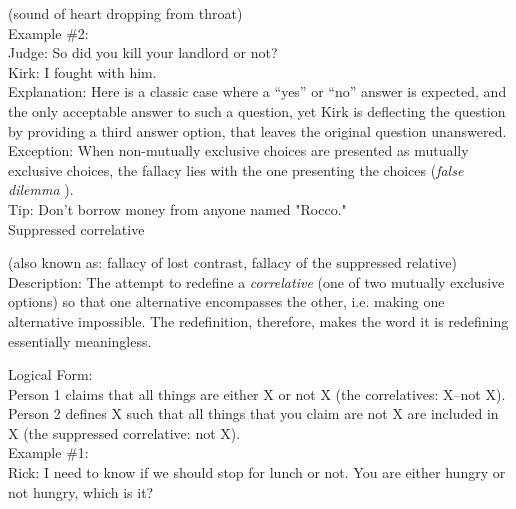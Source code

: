 \documentclass[a4paper,12pt,single,pdftex]{scrbook}
\begin{document}
    
      (sound of heart dropping from throat)
    \\

    
      Example \#2:
    \\

    
      Judge: So did you kill your landlord or not?
    \\

    
      Kirk: I fought with him.
    \\

    
      Explanation: Here is a classic case where a “yes” or “no” answer is expected, and the only acceptable answer to such a question, yet Kirk is deflecting the question by providing a third answer option, that leaves the original question unanswered.
    \\

    
      Exception: When non-mutually exclusive choices are presented as mutually exclusive choices, the fallacy lies with the one presenting the choices ({\it false dilemma} ).
    \\

    
      Tip: Don’t borrow money from anyone named "Rocco."
    \\

  

Suppressed correlative
    
      (also known as: fallacy of lost contrast, fallacy of the suppressed relative)
    \\

  
    Description: The attempt to redefine a {\it correlative} (one of two mutually exclusive options) so that one alternative encompasses the other, i.e. making one alternative impossible. The redefinition, therefore, makes the word it is redefining essentially meaningless.

    
      Logical Form:
    \\

    
      Person 1 claims that all things are either X or not X (the correlatives: X–not X).
    \\

    
      Person 2 defines X such that all things that you claim are not X are included in X (the suppressed correlative: not X).
    \\

    
      Example \#1:
    \\

    
      Rick: I need to know if we should stop for lunch or not.  You are either hungry or not hungry, which is it?
    \\
\end{document}
